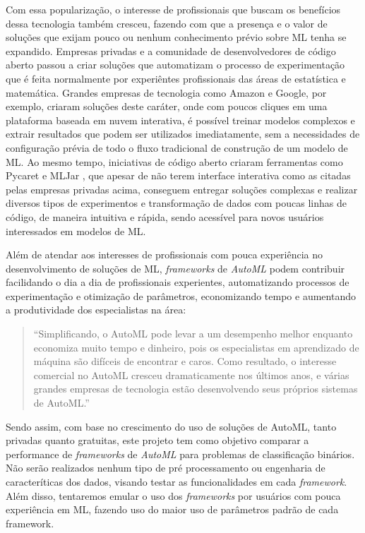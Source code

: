 \documentclass[9pt, a4paper, twocolumn]{article}
\begin{document}
Com essa popularização, o interesse de profissionais que buscam os benefícios dessa tecnologia também cresceu, fazendo com que a presença e o valor de soluções que exijam pouco ou nenhum conhecimento prévio sobre ML tenha se expandido. Empresas privadas e a comunidade de desenvolvedores de código aberto passou a criar soluções que automatizam o processo de experimentação que é feita normalmente por experiêntes profissionais das áreas de estatística e matemática. Grandes empresas de tecnologia como Amazon e Google, por exemplo, criaram soluções deste caráter, onde com poucos cliques em uma plataforma baseada em nuvem interativa, é possível treinar modelos complexos e extrair resultados que podem ser utilizados imediatamente, sem a necessidades de configuração prévia de todo o fluxo tradicional de construção de um modelo de ML. Ao mesmo tempo, iniciativas de código aberto criaram ferramentas como Pycaret \cite{PyCaret} e MLJar \cite{mljar}, que apesar de não terem interface interativa como as citadas pelas empresas privadas acima, conseguem entregar soluções complexas e realizar diversos tipos de experimentos e transformação de dados com poucas linhas de código, de maneira intuitiva e rápida, sendo acessível para novos usuários interessados em modelos de ML.

Além de atendar aos interesses de profissionais com pouca experiência no desenvolvimento de soluções de ML, \emph{frameworks} de \emph{AutoML} podem contribuir facilidando o dia a dia de profissionais experientes, automatizando processos de experimentação e otimização de parâmetros, economizando tempo e aumentando a produtividade dos especialistas na área:

\begin{quote}
``Simplificando, o AutoML pode levar a um desempenho melhor enquanto economiza muito tempo e dinheiro, pois os especialistas em aprendizado de máquina são difíceis de encontrar e caros. Como resultado, o interesse comercial no AutoML cresceu dramaticamente nos últimos anos, e várias grandes empresas de tecnologia estão desenvolvendo seus próprios sistemas de AutoML.''\cite{HutterLars2020}
\end{quote}

Sendo assim, com base no crescimento do uso de soluções de AutoML, tanto privadas quanto gratuitas, este projeto tem como objetivo comparar a performance de \emph{frameworks} de \emph{AutoML} para problemas de classificação binários. Não serão realizados nenhum tipo de pré processamento ou engenharia de caracteríticas dos dados, visando testar as funcionalidades em cada \emph{framework}. Além disso, tentaremos emular o uso dos \emph{frameworks} por usuários com pouca experiência em ML, fazendo uso do maior uso de parâmetros padrão de cada framework.
\end{document}
